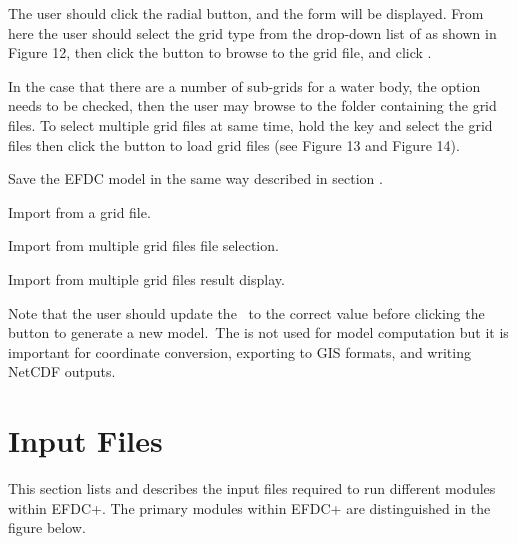\documentclass[letterpaper,10pt,english]{sphinxmanual}
\begin{document}
The user should click the  radial button, and the  form will be displayed. From here the user should select the grid
type from the drop-down list of  as shown in Figure 12, then
click the  button to browse to the grid file, and click .

In the case that there are a number of sub-grids for a water body, the
 option needs to be checked, then the user may
browse to the folder containing the grid files. To select multiple grid
files at same time, hold the  key and select the grid files then
click the  button to load grid files (see Figure 13 and Figure 14).

Save the EFDC model in the same way described in section {\hyperref[\detokenize{gridgen/uniformgrid:uniformgrid}]{}}.


 Import from a grid file.


 Import from multiple grid files \textendash{} file selection.


 Import from multiple grid files \textendash{} result display.

Note that the user should update the  to the correct value
before clicking the  button to generate a new model. The 
is not used for model computation but it is important for coordinate
conversion, exporting to GIS formats, and writing NetCDF outputs.


\section{Input Files}
\label{\detokenize{inputfiles/index:input-files}}\label{\detokenize{inputfiles/index:inputfiles}}\label{\detokenize{inputfiles/index::doc}}
This section lists and describes the input files required to run different modules within EFDC+. The primary modules within EFDC+ are distinguished in the figure below.
\end{document}
